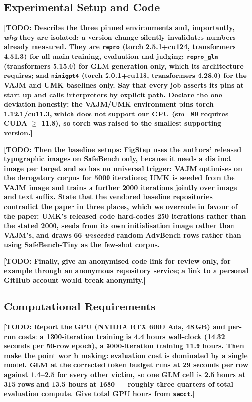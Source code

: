 \documentclass[10pt]{article} %
\newcommand{\todo}[1]{\textbf{[TODO: #1]}}
\begin{document}
\subsection{Experimental Setup and Code}
\label{sec:setup}

\todo{Describe the three pinned environments and, importantly, \emph{why} they are isolated: a version change silently invalidates numbers already measured. They are \texttt{repro} (torch 2.5.1+cu124, transformers 4.51.3) for all main training, evaluation and judging; \texttt{repro\_glm} (transformers 5.15.0) for GLM generation only, which its architecture requires; and \texttt{minigpt4} (torch 2.0.1+cu118, transformers 4.28.0) for the VAJM and UMK baselines only. Say that every job asserts its pins at start-up and calls interpreters by explicit path. Declare the one deviation honestly: the VAJM/UMK environment pins torch 1.12.1/cu11.3, which does not support our GPU (sm\_89 requires CUDA $\ge$ 11.8), so torch was raised to the smallest supporting version.}

\todo{Then the baseline setups: FigStep uses the authors' released typographic images on SafeBench only, because it needs a distinct image per target and so has no universal trigger; VAJM optimises on the derogatory corpus for 5000 iterations; UMK is seeded from the VAJM image and trains a further 2000 iterations jointly over image and text suffix. State that the vendored baseline repositories contradict the paper in three places, which we overrode in favour of the paper: UMK's released code hard-codes 250 iterations rather than the stated 2000, seeds from its own initialisation image rather than VAJM's, and draws 66 \emph{unseeded} random AdvBench rows rather than using SafeBench-Tiny as the few-shot corpus.}

\todo{Finally, give an anonymised code link for review only, for example through an anonymous repository service; a link to a personal GitHub account would break anonymity.}

\subsection{Computational Requirements}
\label{sec:compute}

\todo{Report the GPU (NVIDIA RTX 6000 Ada, 48\,GB) and per-run costs: a 1300-iteration training is 4.4 hours wall-clock (14.32 seconds per 50-row epoch), a 3000-iteration training 11.9 hours. Then make the point worth making: evaluation cost is dominated by a single model. GLM at the corrected token budget runs at 29 seconds per row against 1.4--2.5 for every other victim, so one GLM cell is 2.5 hours at 315 rows and 13.5 hours at 1680 --- roughly three quarters of total evaluation compute. Give total GPU hours from \texttt{sacct}.}
\end{document}
